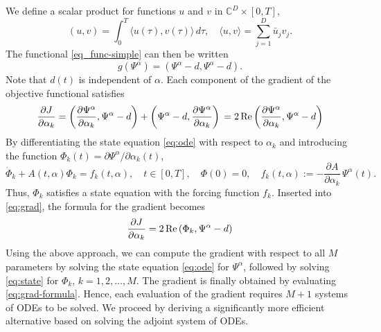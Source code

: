\documentclass[11pt]{article}
\begin{document}
We define a scalar product for functions $u$ and $v$ in ${\mathbb C}^D \times [0,T]$,
\[
(u,v) = \int_0^T \langle u(\tau), v(\tau)\rangle\, d\tau,\quad \langle u, v\rangle =
\sum_{j=1}^D \bar{u}_j v_j.
\]
The functional \eqref{eq_func-simple} can then be written
\[
g(\Psi^\alpha) = (\Psi^\alpha - d, \Psi^\alpha - d).
\]
Note that $d(t)$ is independent of $\alpha$. Each component of the gradient of the objective
functional satisfies
\begin{equation}\label{eq:grad}
  \frac{\partial J}{\partial \alpha_k} =
%
  \left(\frac{\partial\Psi^\alpha}{\partial \alpha_k}, \Psi^\alpha-d \right) +
  \left(\Psi^\alpha-d, \frac{\partial\Psi^\alpha}{\partial \alpha_k} \right) \\
  = 2\, {\rm Re} \left(
\frac{\partial\Psi^\alpha}{\partial \alpha_k}, \Psi^\alpha-d \right)
\end{equation}
By differentiating the state equation \eqref{eq:ode} with respect to
$\alpha_k$ and introducing the function $\Phi_k(t) = \partial \Psi^\alpha/\partial \alpha_k(t)$,
\begin{equation}\label{eq:state}
\dot{\Phi}_k +
A(t,\alpha) \Phi_k = f_k(t,\alpha),\quad
t\in[0,T], \quad \Phi(0) = 0,\quad f_k(t,\alpha) := - \frac{\partial A}{\partial \alpha_k}\,\Psi^\alpha(t).
\end{equation}
Thus, $\Phi_k$ satisfies a state equation with the forcing function $f_k$. Inserted into
\eqref{eq:grad}, the formula for the gradient becomes
\begin{equation}\label{eq:grad-formula}
\frac{\partial J}{\partial \alpha_k} = 2\, {\rm Re} \left( \Phi_k, \Psi^\alpha - d \right)
\end{equation}
Using the above approach, we can compute the gradient with respect to all $M$ parameters by solving
the state equation \eqref{eq:ode} for $\Psi^\alpha$, followed by solving \eqref{eq:state} for
$\Phi_k$, $k=1,2,\ldots,M$. The gradient is finally obtained by evaluating \eqref{eq:grad-formula}. Hence,
each evaluation of the gradient requires $M+1$ systems of ODEs to be solved. We proceed by deriving a
significantly more efficient alternative based on solving the adjoint system of ODEs.
\end{document}
